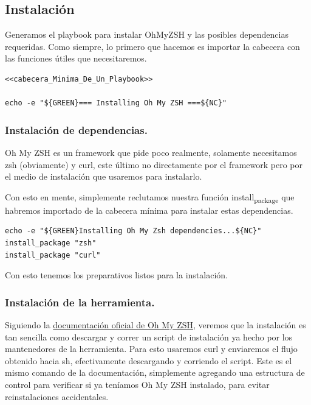 \documentclass[11pt]{article}
\begin{document}
\subsection{Instalación}
\label{sec:orgef131cd}

Generamos el playbook para instalar OhMyZSH y las posibles dependencias requeridas. Como siempre, lo primero que hacemos es importar la cabecera con las funciones útiles que necesitaremos.

\begin{verbatim}
<<cabecera_Minima_De_Un_Playbook>>

echo -e "${GREEN}=== Installing Oh My ZSH ===${NC}"

\end{verbatim}
\subsubsection{Instalación de dependencias.}
\label{sec:org4052ffb}

Oh My ZSH es un framework que pide poco realmente, solamente necesitamos zsh (obviamente) y curl, este último no directamente por el framework pero por el medio de instalación que usaremos para instalarlo.

Con esto en mente, simplemente reclutamos nuestra función install\textsubscript{package} que habremos importado de la cabecera mínima para instalar estas dependencias.

\begin{verbatim}
echo -e "${GREEN}Installing Oh My Zsh dependencies...${NC}"
install_package "zsh"
install_package "curl"

\end{verbatim}

Con esto tenemos los preparativos listos para la instalación.
\subsubsection{Instalación de la herramienta.}
\label{sec:org8328171}

Siguiendo la \href{https://github.com/ohmyzsh/ohmyzsh/wiki}{documentación oficial de Oh My ZSH}, veremos que la instalación es tan sencilla como descargar y correr un script de instalación ya hecho por los mantenedores de la herramienta. Para esto usaremos curl y enviaremos el flujo obtenido hacia sh, efectivamente descargando y corriendo el script. Este es el mismo comando de la documentación, simplemente agregando una estructura de control para verificar si ya teníamos Oh My ZSH instalado, para evitar reinstalaciones accidentales.
\end{document}
